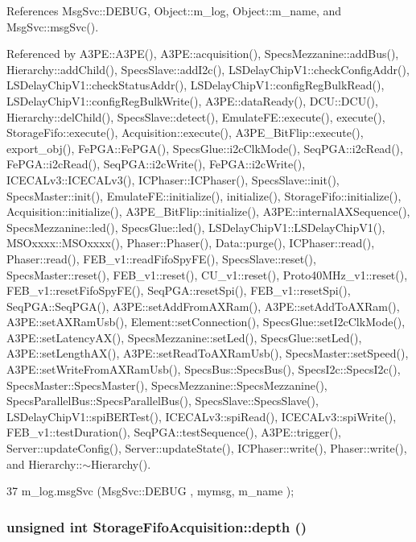 References MsgSvc::DEBUG, Object::m\_\-log, Object::m\_\-name, and MsgSvc::msgSvc().

Referenced by A3PE::A3PE(), A3PE::acquisition(), SpecsMezzanine::addBus(), Hierarchy::addChild(), SpecsSlave::addI2c(), LSDelayChipV1::checkConfigAddr(), LSDelayChipV1::checkStatusAddr(), LSDelayChipV1::configRegBulkRead(), LSDelayChipV1::configRegBulkWrite(), A3PE::dataReady(), DCU::DCU(), Hierarchy::delChild(), SpecsSlave::detect(), EmulateFE::execute(), execute(), StorageFifo::execute(), Acquisition::execute(), A3PE\_\-BitFlip::execute(), export\_\-obj(), FePGA::FePGA(), SpecsGlue::i2cClkMode(), SeqPGA::i2cRead(), FePGA::i2cRead(), SeqPGA::i2cWrite(), FePGA::i2cWrite(), ICECALv3::ICECALv3(), ICPhaser::ICPhaser(), SpecsSlave::init(), SpecsMaster::init(), EmulateFE::initialize(), initialize(), StorageFifo::initialize(), Acquisition::initialize(), A3PE\_\-BitFlip::initialize(), A3PE::internalAXSequence(), SpecsMezzanine::led(), SpecsGlue::led(), LSDelayChipV1::LSDelayChipV1(), MSOxxxx::MSOxxxx(), Phaser::Phaser(), Data::purge(), ICPhaser::read(), Phaser::read(), FEB\_\-v1::readFifoSpyFE(), SpecsSlave::reset(), SpecsMaster::reset(), FEB\_\-v1::reset(), CU\_\-v1::reset(), Proto40MHz\_\-v1::reset(), FEB\_\-v1::resetFifoSpyFE(), SeqPGA::resetSpi(), FEB\_\-v1::resetSpi(), SeqPGA::SeqPGA(), A3PE::setAddFromAXRam(), A3PE::setAddToAXRam(), A3PE::setAXRamUsb(), Element::setConnection(), SpecsGlue::setI2cClkMode(), A3PE::setLatencyAX(), SpecsMezzanine::setLed(), SpecsGlue::setLed(), A3PE::setLengthAX(), A3PE::setReadToAXRamUsb(), SpecsMaster::setSpeed(), A3PE::setWriteFromAXRamUsb(), SpecsBus::SpecsBus(), SpecsI2c::SpecsI2c(), SpecsMaster::SpecsMaster(), SpecsMezzanine::SpecsMezzanine(), SpecsParallelBus::SpecsParallelBus(), SpecsSlave::SpecsSlave(), LSDelayChipV1::spiBERTest(), ICECALv3::spiRead(), ICECALv3::spiWrite(), FEB\_\-v1::testDuration(), SeqPGA::testSequence(), A3PE::trigger(), Server::updateConfig(), Server::updateState(), ICPhaser::write(), Phaser::write(), and Hierarchy::$\sim$Hierarchy().


\begin{DoxyCode}
37 { m_log.msgSvc (MsgSvc::DEBUG   , mymsg, m_name ); }
\end{DoxyCode}
\hypertarget{classStorageFifoAcquisition_a2d549502ced65dc2e02500d2216ad23b}{
\subsubsection[{depth}]{\setlength{\rightskip}{0pt plus 5cm}unsigned int StorageFifoAcquisition::depth ()}}
\label{classStorageFifoAcquisition_a2d549502ced65dc2e02500d2216ad23b}


